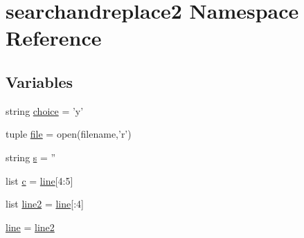 \hypertarget{namespacesearchandreplace2}{
\section{searchandreplace2 Namespace Reference}
\label{namespacesearchandreplace2}
}
\subsection*{Variables}
\begin{DoxyCompactItemize}
\item 
string \hyperlink{namespacesearchandreplace2_a0b33cdf2d68e113792cf457aa40e09e4}{choice} = 'y'
\item 
tuple \hyperlink{namespacesearchandreplace2_a2807d39a49d7218457401f7d0bdbf9a2}{file} = open(filename,'r')
\item 
string \hyperlink{namespacesearchandreplace2_a171e4f45668f07d4e371b2394c1cedaf}{s} = ''
\item 
list \hyperlink{namespacesearchandreplace2_a3eef88240d5197333eeec54ea8790760}{c} = \hyperlink{namespacesearchandreplace2_ab9e22bdeaf96c9e66ce103b442a9bc89}{line}\mbox{[}4:5\mbox{]}
\item 
list \hyperlink{namespacesearchandreplace2_a0e57eecc1067aa2d3c5e556bbe67e115}{line2} = \hyperlink{namespacesearchandreplace2_ab9e22bdeaf96c9e66ce103b442a9bc89}{line}\mbox{[}:4\mbox{]}
\item 
\hyperlink{namespacesearchandreplace2_ab9e22bdeaf96c9e66ce103b442a9bc89}{line} = \hyperlink{namespacesearchandreplace2_a0e57eecc1067aa2d3c5e556bbe67e115}{line2}
\end{DoxyCompactItemize}


